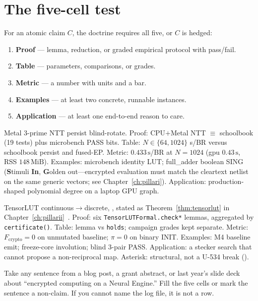 \section{The five-cell test}

For an atomic claim $C$, the doctrine requires all five, or $C$ is hedged:

\begin{enumerate}
  \item \textbf{Proof} --- lemma, reduction, or graded empirical protocol with
        pass/fail.
  \item \textbf{Table} --- parameters, comparisons, or grades.
  \item \textbf{Metric} --- a number with units and a bar.
  \item \textbf{Examples} --- at least two concrete, runnable instances.
  \item \textbf{Application} --- at least one end-to-end reason to care.
\end{enumerate}

\begin{example}
Metal 3-prime NTT persist blind-rotate.
Proof: CPU$+$Metal NTT $\equiv$ schoolbook (19 tests) plus microbench PASS bits.
Table: $N\in\{64,1024\}$ s/BR versus schoolbook persist and fused-EP.
Metric: $0.433\,\mathrm{s}$/BR at $N=1024$ (gpu $0.43\,\mathrm{s}$, RSS $148\,\mathrm{MiB}$).
Examples: microbench identity LUT; full\_adder boolean
SING (\textbf{S}timuli \textbf{In}, \textbf{G}olden out---encrypted evaluation
must match the cleartext netlist on the same generic vectors; see
Chapter~\ref{ch:pillari}).
Application: production-shaped polynomial degree on a laptop GPU graph.
\end{example}

\begin{example}
TensorLUT continuous$\to$discrete, , stated as
Theorem~\ref{thm:tensorlut} in Chapter~\ref{ch:pillarii}~\cite{helut-tensorlut-thm}.
Proof: six \texttt{TensorLUTFormal.check*} lemmas, aggregated by
\texttt{certificate()}.
Table: lemma vs \texttt{holds}; campaign grades kept separate.
Metric: $F_{\mathrm{crypto}}=0$ on unmutated baseline; $\pi=0$ on binary INIT.
Examples: M4 baseline emit; freeze-core involution; blind 3-pair PASS.
Application: a stecker search that cannot propose a non-reciprocal map.
Asterisk: structural, not a U-534 break ().
\end{example}

\begin{exercise}
Take any sentence from a blog post, a grant abstract, or last year's slide
deck about ``encrypted computing on a Neural Engine.''
Fill the five cells or mark the sentence a non-claim.
If you cannot name the log file, it is not a  row.
\end{exercise}

